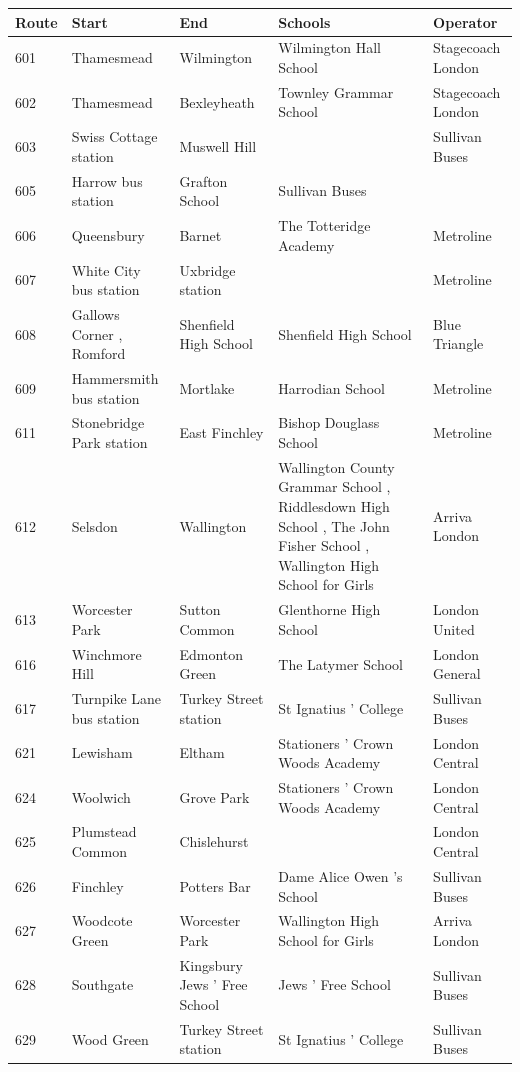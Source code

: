 \documentclass{article}
\begin{document}
\begin{tabular}{lllll}
\toprule
Route & Start & End & Schools & Operator \\
\midrule
601 & Thamesmead & Wilmington & Wilmington Hall School & Stagecoach London \\
602 & Thamesmead & Bexleyheath & Townley Grammar School & Stagecoach London \\
603 & Swiss Cottage station & Muswell Hill &  & Sullivan Buses \\
605 & Harrow bus station & Grafton School & Sullivan Buses &  \\
606 & Queensbury & Barnet & The Totteridge Academy & Metroline \\
607 & White City bus station & Uxbridge station &  & Metroline \\
608 & Gallows Corner , Romford & Shenfield High School & Shenfield High School & Blue Triangle \\
609 & Hammersmith bus station & Mortlake & Harrodian School & Metroline \\
611 & Stonebridge Park station & East Finchley & Bishop Douglass School & Metroline \\
612 & Selsdon & Wallington & Wallington County Grammar School , Riddlesdown High School , The John Fisher School , Wallington High School for Girls & Arriva London \\
613 & Worcester Park & Sutton Common & Glenthorne High School & London United \\
616 & Winchmore Hill & Edmonton Green & The Latymer School & London General \\
617 & Turnpike Lane bus station & Turkey Street station & St Ignatius ' College & Sullivan Buses \\
621 & Lewisham & Eltham & Stationers ' Crown Woods Academy & London Central \\
624 & Woolwich & Grove Park & Stationers ' Crown Woods Academy & London Central \\
625 & Plumstead Common & Chislehurst &  & London Central \\
626 & Finchley & Potters Bar & Dame Alice Owen 's School & Sullivan Buses \\
627 & Woodcote Green & Worcester Park & Wallington High School for Girls & Arriva London \\
628 & Southgate & Kingsbury Jews ' Free School & Jews ' Free School & Sullivan Buses \\
629 & Wood Green & Turkey Street station & St Ignatius ' College & Sullivan Buses \\
\bottomrule
\end{tabular}
\end{document}
